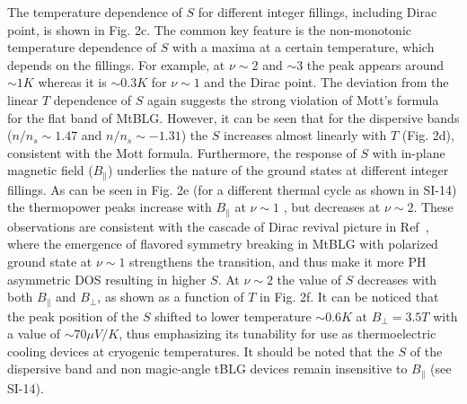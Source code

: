 \documentclass{nature}
\begin{document}
The temperature dependence of $S$ for different integer fillings, including Dirac point, is shown in Fig. 2c. The common key feature is the non-monotonic temperature dependence of $S$ with a maxima at a certain temperature, which depends on the fillings. For example, at $\nu \sim 2$ and $\sim 3$ the peak appears around $\sim 1K$ whereas it is $\sim 0.3K$ for $\nu \sim 1$ and the Dirac point. The deviation from the linear $T$ dependence of $S$ again suggests the strong violation of Mott's formula~\cite{PhysRev.181.1336} for the flat band of MtBLG. However, it can be seen that for the dispersive bands ($n/n_{s} \sim 1.47$ and $n/n_{s} \sim -1.31$) the $S$ increases almost linearly with $T$ (Fig. 2d), consistent with the Mott formula. %
Furthermore, the response of $S$ with in-plane magnetic field ($B_{\parallel}$) underlies the nature of the ground states at different integer fillings. As can be seen in Fig. 2e (for a different thermal cycle as shown in SI-14) the thermopower peaks increase with $B_{\parallel}$ at $\nu \sim 1$ %
, but decreases at $\nu \sim 2$. %
These observations are consistent with the cascade of Dirac revival picture in Ref~\cite{zondiner2020cascade}, where the emergence of flavored symmetry breaking in MtBLG with %
polarized ground state at $\nu \sim 1$ %
strengthens the transition, and thus make it more PH asymmetric DOS resulting in higher $S$. At $\nu \sim 2$ the value of $S$ decreases with both $B_{\parallel}$ and $B_{\perp}$, as shown as a function of $T$ in Fig. 2f. It can be noticed that the peak position of the $S$ shifted to lower temperature $\sim 0.6K$ at $B_{\perp} = 3.5T$ with a value of $\sim 70 \mu V/K$, thus emphasizing its tunability for use as thermoelectric cooling devices at cryogenic temperatures. It should be noted that the $S$ of the dispersive band and non magic-angle tBLG devices remain insensitive to $B_{\parallel}$ (see SI-14).
\end{document}
